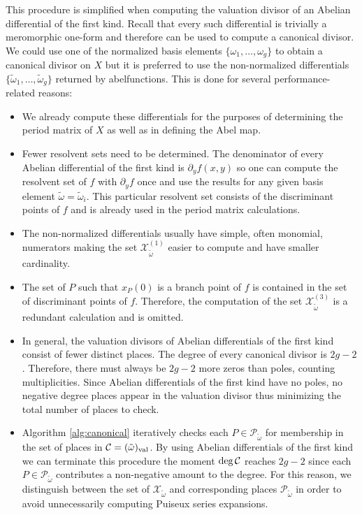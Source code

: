 This procedure is simplified when computing the valuation divisor of an Abelian
differential of the first kind. Recall that every such differential is trivially
a meromorphic one-form and therefore can be used to compute a canonical divisor.
We could use one of the normalized basis elements $\{\omega_1, \ldots,
\omega_g\}$ to obtain a canonical divisor on $X$ but it is preferred to use the
non-normalized differentials $\{\tilde{\omega}_1, \ldots, \tilde{\omega}_g\}$
returned by {\sc abelfunctions}. This is done for several performance-related
reasons:
\begin{itemize}
\item We already compute these differentials for the purposes of determining the
  period matrix of $X$ as well as in defining the Abel map.
\item Fewer resolvent sets need to be determined. The denominator of every
  Abelian differential of the first kind is $\partial_y f(x,y)$
  \cite{Brieskorn86,Noether83} so one can compute the resolvent set of $f$ with
  $\partial_y f$ once and use the results for any given basis element
  $\tilde{\omega} = \tilde{\omega}_i$. This particular resolvent set consists of
  the discriminant points of $f$ and is already used in the period matrix
  calculations.
\item The non-normalized differentials usually have simple, often monomial,
  numerators making the set $\mathcal{X}_{\tilde{\omega}}^{(1)}$ easier to
  compute and have smaller cardinality.
\item The set of $P$ such that $x_P(0)$ is a branch point of $f$ is contained in
  the set of discriminant points of $f$. Therefore, the computation of the set
  $\mathcal{X}_{\tilde{\omega}}^{(3)}$ is a redundant calculation and is
  omitted.
\item In general, the valuation divisors of Abelian differentials of the first
  kind consist of fewer distinct places. The degree of every canonical divisor
  is $2g-2$. Therefore, there must always be $2g-2$ more zeros than poles,
  counting multiplicities. Since Abelian differentials of the first kind have no
  poles, no negative degree places appear in the valuation divisor thus
  minimizing the total number of places to check.
\item Algorithm \ref{alg:canonical} iteratively checks each $P \in
  \mathcal{P}_{\tilde{\omega}}$ for membership in the set of places in $\operatorname{\mathcal{C}} =
  (\tilde{\omega})_\text{val}$. By using Abelian differentials of the first kind
  we can terminate this procedure the moment $\deg \operatorname{\mathcal{C}}$ reaches $2g-2$ since
  each $P\in\mathcal{P}_{\tilde{\omega}}$ contributes a non-negative amount to
  the degree. For this reason, we distinguish between the set of
  $\mathcal{X}_{\tilde{\omega}}$ and corresponding places
  $\mathcal{P}_{\tilde{\omega}}$ in order to avoid unnecessarily computing
  Puiseux series expansions.
\end{itemize}

